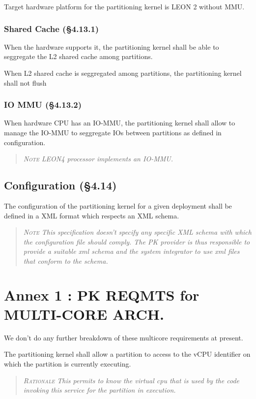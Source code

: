 Target hardware platform for the partitioning kernel is LEON 2 without MMU.

\subsubsection{Shared Cache (\S4.13.1)}

When the hardware supports it, the partitioning kernel shall be able to seggregate the L2 shared cache among partitions.

When L2 shared cache is seggregated among partitions, the partitioning kernel shall not flush

\subsubsection{IO MMU (\S4.13.2)}

When hardware CPU has an IO-MMU, the partitioning kernel shall allow to manage the IO-MMU to seggregate IOs between partitions as defined in configuration.
\begin{quote}\it
\textsc{Note}
LEON4 processor implements an IO-MMU.
\end{quote}

\subsection{Configuration (\S4.14)}

The configuration of the partitioning kernel for a given deployment shall be defined in a XML format which respects an XML schema.
\begin{quote}\it
\textsc{Note}
This specification doesn't specify any specific XML schema with which the configuration file should comply. The PK provider is thus responsible to provide a suitable xml schema and the system integrator to use xml files that conform to the schema.
\end{quote}

\newpage
\section{Annex 1 : PK REQMTS for MULTI-CORE ARCH.}

We don't do any further breakdown of these multicore requirements
at present.

The partitioning kernel shall allow a partition to access to the vCPU identifier on which the partition is currently executing.
\begin{quote}\it
\textsc{Rationale}
This permits to know the virtual cpu that is used by the code invoking this service for the partition in execution.
\end{quote}

